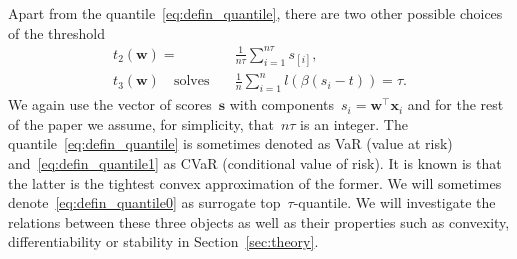 Apart from the quantile~\eqref{eq:defin_quantile}, there are two other possible choices of the threshold
\begin{align}
  \label{eq:defin_quantile1} t_2(\bm{w}) =\ &\frac{1}{n\tau}\sum_{i=1}^{n\tau} s_{[i]}, \\
  \label{eq:defin_quantile0} t_3(\bm{w})\quad \text{solves} \quad & \frac{1}{n}\sum_{i = 1}^nl(\beta(s_i - t)) = \tau.
\end{align}
We again use the vector of scores~$\bm{s}$ with components~$s_i = \bm{w}^\top \bm{x}_i$ and for the rest of the paper we assume, for simplicity, that~$n\tau$ is an integer. The quantile~\eqref{eq:defin_quantile} is sometimes denoted as VaR (value at risk) and~\eqref{eq:defin_quantile1} as CVaR (conditional value of risk). It is known is that the latter is the tightest convex approximation of the former. We will sometimes denote~\eqref{eq:defin_quantile0} as surrogate top~$\tau$-quantile. We will investigate the relations between these three objects as well as their properties such as convexity, differentiability or stability in Section~\ref{sec:theory}.

